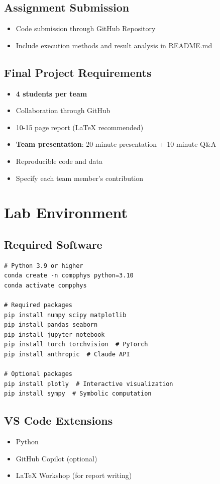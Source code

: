 \documentclass[11pt,a4paper]{article}
\begin{document}
\subsection{Assignment Submission}
\begin{itemize}[noitemsep]
    \item Code submission through GitHub Repository
    \item Include execution methods and result analysis in README.md
\end{itemize}

\subsection{Final Project Requirements}
\begin{itemize}[noitemsep]
    \item \textbf{4 students per team}
    \item Collaboration through GitHub
    \item 10-15 page report (LaTeX recommended)
    \item \textbf{Team presentation}: 20-minute presentation + 10-minute Q\&A
    \item Reproducible code and data
    \item Specify each team member's contribution
\end{itemize}

\section{Lab Environment}

\subsection{Required Software}
\begin{verbatim}
# Python 3.9 or higher
conda create -n compphys python=3.10
conda activate compphys

# Required packages
pip install numpy scipy matplotlib
pip install pandas seaborn
pip install jupyter notebook
pip install torch torchvision  # PyTorch
pip install anthropic  # Claude API

# Optional packages
pip install plotly  # Interactive visualization
pip install sympy  # Symbolic computation
\end{verbatim}

\subsection{VS Code Extensions}
\begin{itemize}[noitemsep]
    \item Python
    \item GitHub Copilot (optional)
    \item LaTeX Workshop (for report writing)
\end{itemize}
\end{document}
